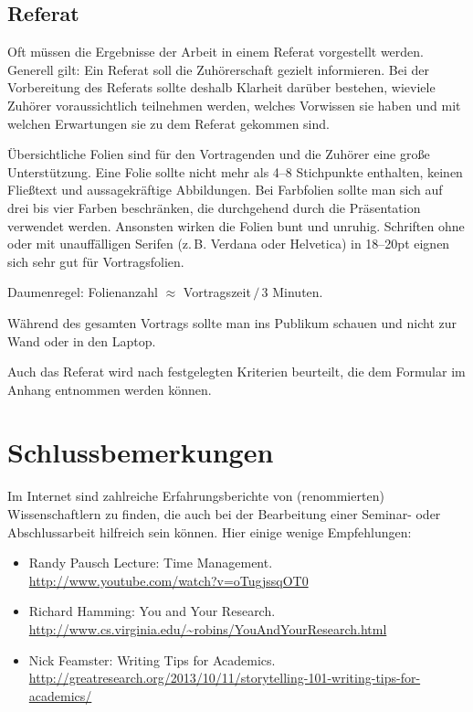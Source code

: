 \documentclass[
    12pt,
    headings=small,
    parskip=half,           %
    bibliography=totoc,
    numbers=noenddot,       %
    open=any,               %
    ]{scrreprt}
\begin{document}
\section{Referat}

Oft müssen die Ergebnisse der Arbeit in einem Referat vorgestellt werden. Generell gilt: Ein Referat soll die Zuhörerschaft gezielt informieren. Bei der Vorbereitung des Referats sollte deshalb Klarheit darüber bestehen, wieviele Zuhörer voraussichtlich teilnehmen werden, welches Vorwissen sie haben und mit welchen Erwartungen sie zu dem Referat gekommen sind.

Übersichtliche Folien sind für den Vortragenden und die Zuhörer eine große Unterstützung. Eine Folie sollte nicht mehr als 4--8 Stichpunkte enthalten, keinen Fließtext und aussagekräftige Abbildungen. Bei Farbfolien sollte man sich auf drei bis vier Farben beschränken, die durchgehend durch die Präsentation verwendet werden. Ansonsten wirken die Folien bunt und unruhig. Schriften ohne oder mit unauffälligen Serifen (z.\,B. Verdana oder Helvetica) in 18--20pt eignen sich sehr gut für Vortragsfolien.

Daumenregel: Folienanzahl $\approx$ Vortragszeit$\,/\,$3 Minuten.

Während des gesamten Vortrags sollte man ins Publikum schauen und nicht zur Wand oder in den Laptop.

Auch das Referat wird nach festgelegten Kriterien beurteilt, die dem Formular im Anhang entnommen werden können.

\chapter{Schlussbemerkungen}

Im Internet sind zahlreiche Erfahrungsberichte von (renommierten) Wissenschaftlern zu finden, die auch bei der Bearbeitung einer Seminar- oder Abschlussarbeit hilfreich sein können. Hier einige wenige Empfehlungen:

\begin{itemize}
	\item Randy Pausch Lecture: Time Management. \\ \url{http://www.youtube.com/watch?v=oTugjssqOT0}
	\item Richard Hamming: You and Your Research. \\ \url{http://www.cs.virginia.edu/~robins/YouAndYourResearch.html}
	\item Nick Feamster: Writing Tips for Academics. \\ \url{http://greatresearch.org/2013/10/11/storytelling-101-writing-tips-for-academics/}
\end{itemize}
\end{document}
